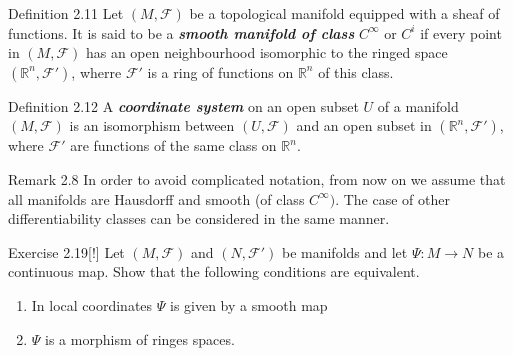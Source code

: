 \begin{thing3}{Definition 2.11}\label{def:2.11}\leavevmode
	Let $(M,\mathcal{F})$ be a topological manifold equipped with a sheaf of functions. It is said to be a \textit{\textbf{smooth manifold of class}} $C^\infty$ or  $C^i$ if every point in $(M,\mathcal{F})$ has an open neighbourhood isomorphic to the ringed space $(\mathbb{R}^n, \mathcal{F}')$, wherre $\mathcal{F}'$ is a ring of functions on $\mathbb{R}^n$ of this class.
\end{thing3}

\begin{thing3}{Definition 2.12}\leavevmode
A \textit{\textbf{coordinate system}} on an open subset $U$ of a manifold $(M,\mathcal{F})$ is an isomorphism between $(U,\mathcal{F})$ and an open subset in $(\mathbb{R}^n,\mathcal{F}')$, where $\mathcal{F}'$ are functions of the same class on $\mathbb{R}^n$.
\end{thing3}

\begin{thing5}{Remark 2.8}\leavevmode
In order to avoid complicated notation, from now on we assume that all manifolds are Hausdorff and smooth (of class $C^\infty)$. The case of other differentiability classes can be considered in the same manner.
\end{thing5}

\begin{thing4}{Exercise 2.19}[!]\label{exer:2.19}\leavevmode
Let $(M,\mathcal{F})$ and $(N,\mathcal{F}')$ be manifolds and let $\Psi:M \to N$ be a continuous map. Show that the following conditions are equivalent.
\begin{enumerate}[label=(\roman*)]
\item In local coordinates $\Psi$ is given by a smooth map
\item $\Psi$ is a morphism of ringes spaces.
\end{enumerate}
\end{thing4}

